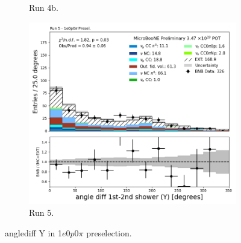 \begin{figure}[H]
\begin{subfigure}[t]{0.32\linewidth}
        \caption{Run 4b.}
    \end{subfigure}%
    \hspace{0.2cm}%
    \begin{subfigure}[t]{0.32\linewidth}
        \includegraphics[width=\linewidth]{technote/Appendix_Preselection/Figures/1e0p0pi/Run5/anglediff_Y_Run5_1e0p0pi_Presel.png}
        \caption{Run 5.}
    \end{subfigure}
    \caption{anglediff Y in 1$e$0$p$0$\pi$ preselection.}
\end{figure}


